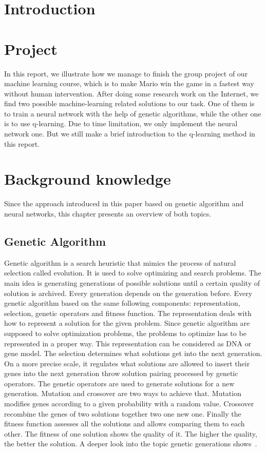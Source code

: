 \documentclass[a4paper]{article}
\begin{document}
\section{Introduction }


\section{Project}
In this report, we illustrate how we manage to finish the group project of our machine learning course, which is to make Mario win the game in a fastest way without human intervention. After doing some research work on the Internet, we find two possible machine-learning related solutions to our task. One of them is to train a neural network with the help of genetic algorithms, while the other one is to use q-learning. Due to time limitation, we only implement the neural network one. But we still make a brief introduction to the q-learning method in this report.

\section{Background knowledge}
Since the approach introduced in this paper based on genetic algorithm and neural networks, this chapter presents an overview of both topics.

\subsection{Genetic Algorithm}
Genetic algorithm is a search heuristic that mimics the process of natural selection called evolution. It is used to solve optimizing and search problems. The main idea is generating generations of possible solutions until a certain quality of solution is archived. Every generation depends on the generation before. Every genetic algorithm based on the same following components: representation, selection, genetic operators and fitness function.
The representation deals with how to represent a solution for the given problem. Since genetic algorithm are supposed to solve optimization problems, the problems to optimize has to be represented in a proper way. This representation can be considered as DNA or gene model.
The selection determines what solutions get into the next generation. On a more precise scale, it regulates what solutions are allowed to insert their genes into the next generation throw solution pairing processed by genetic operators.
The genetic operators are used to generate solutions for a new generation. Mutation and crossover are two ways to achieve that. Mutation modifies genes according to a given probability with a random value. Crossover recombine the genes of two solutions together two one new one.
Finally the fitness function assesses all the solutions and allows comparing them to each other. The fitness of one solution shows the quality of it. The higher the quality, the better the solution.
A deeper look into the topic genetic generations shows~\cite{Jain96}.
\end{document}
